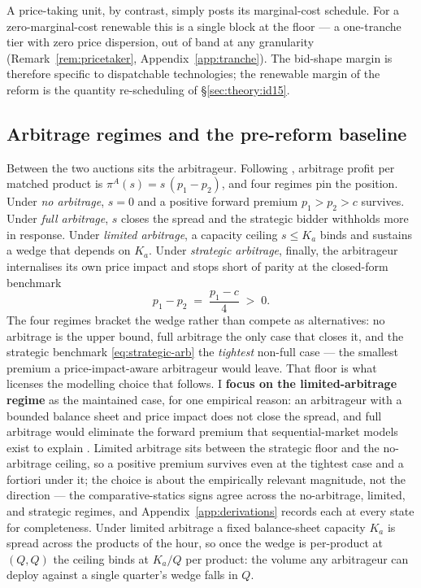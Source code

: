 \documentclass[11pt,a4paper]{article}
\theoremstyle{definition}
\theoremstyle{remark}
\theoremstyle{plain}
\begin{document}
A price-taking unit, by contrast, simply posts its marginal-cost schedule. For a zero-marginal-cost renewable this is a single block at the floor --- a one-tranche tier with zero price dispersion, out of band at any granularity (Remark~\ref{rem:pricetaker}, Appendix~\ref{app:tranche}). The bid-shape margin is therefore specific to dispatchable technologies; the renewable margin of the reform is the quantity re-scheduling of \S\ref{sec:theory:id15}.


\subsection{Arbitrage regimes and the pre-reform baseline}\label{sec:theory:arbitrage}

Between the two auctions sits the arbitrageur. Following \citet[\S I.A and Table 1]{ito_reguant_2016}, arbitrage profit per matched product is $\pi^A(s) = s\,(p_1 - p_2)$, and four regimes pin the position. Under \emph{no arbitrage}, $s = 0$ and a positive forward premium $p_1 > p_2 > c$ survives. Under \emph{full arbitrage}, $s$ closes the spread and the strategic bidder withholds more in response. Under \emph{limited arbitrage}, a capacity ceiling $s \le K_a$ binds and sustains a wedge that depends on $K_a$. Under \emph{strategic arbitrage}, finally, the arbitrageur internalises its own price impact and stops short of parity at the closed-form benchmark
\begin{equation}
\boxed{\;p_1 - p_2 \;=\; \frac{p_1 - c}{4} \;>\; 0.\;}
\label{eq:strategic-arb}
\end{equation}
The four regimes bracket the wedge rather than compete as alternatives: no arbitrage is the upper bound, full arbitrage the only case that closes it, and the strategic benchmark \eqref{eq:strategic-arb} the \emph{tightest} non-full case --- the smallest premium a price-impact-aware arbitrageur would leave. That floor is what licenses the modelling choice that follows. I \textbf{focus on the limited-arbitrage regime} as the maintained case, for one empirical reason: an arbitrageur with a bounded balance sheet and price impact does not close the spread, and full arbitrage would eliminate the forward premium that sequential-market models exist to explain \citep{ito_reguant_2016}. Limited arbitrage sits between the strategic floor and the no-arbitrage ceiling, so a positive premium survives even at the tightest case and a fortiori under it; the choice is about the empirically relevant magnitude, not the direction --- the comparative-statics signs agree across the no-arbitrage, limited, and strategic regimes, and Appendix~\ref{app:derivations} records each at every state for completeness. Under limited arbitrage a fixed balance-sheet capacity $K_a$ is spread across the products of the hour, so once the wedge is per-product at $(Q,Q)$ the ceiling binds at $K_a/Q$ per product: the volume any arbitrageur can deploy against a single quarter's wedge falls in $Q$.
\end{document}
